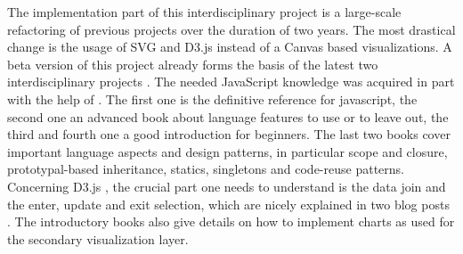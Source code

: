 The implementation part of this interdisciplinary project is a large-scale refactoring of previous projects \cite{storz2013idp,velden2014idp,sefidgar2015idp,becker2015idp,zoennchen2015idp} over the duration of two years. The most drastical change is the usage of SVG and D3.js instead of a Canvas based visualizations. A beta version of this project already forms the basis of the latest two interdisciplinary projects \cite{fischer2016idp,feil2016idp}.
The needed JavaScript knowledge was acquired in part with the help of \cite{flanagan2011javascript,crockford2008javascript,haverbeke2015eloquent,resig2013secrets,herman2012effective,stefanov2010javascript}. The first one is the definitive reference for javascript, the second one an advanced book about language features to use or to leave out, the third and fourth one a good introduction for beginners. The last two books cover important language aspects and design patterns, in particular scope and closure, prototypal-based inheritance, statics, singletons and code-reuse patterns.
Concerning D3.js \cite{bostock2011d3}, the crucial part one needs to understand is the data join and the enter, update and exit selection, which are nicely explained in two blog posts \cite{bostock2012join,bostock2016general}. The introductory books \cite{murray2013interactive,zhu2013data,meeks2015d3} also give details on how to implement charts as used for the secondary visualization layer.

